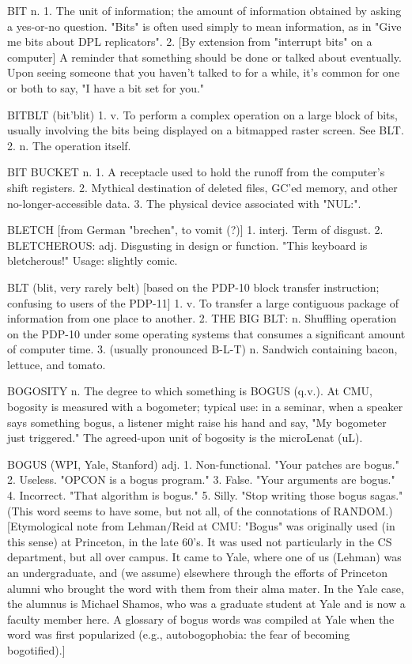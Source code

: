 BIT n. 1. The unit of information; the amount of information obtained
   by asking a yes-or-no question.  "Bits" is often used simply to
   mean information, as in "Give me bits about DPL replicators".  2.
   [By extension from "interrupt bits" on a computer] A reminder that
   something should be done or talked about eventually.	 Upon seeing
   someone that you haven't talked to for a while, it's common for one
   or both to say, "I have a bit set for you."

BITBLT (bit'blit) 1. v. To perform a complex operation on a large
   block of bits, usually involving the bits being displayed on a
   bitmapped raster screen.  See BLT.  2. n. The operation itself.

BIT BUCKET n. 1. A receptacle used to hold the runoff from the
   computer's shift registers.	2. Mythical destination of deleted
   files, GC'ed memory, and other no-longer-accessible data.  3. The
   physical device associated with "NUL:".

BLETCH [from German "brechen", to vomit (?)] 1. interj. Term of
   disgust.  2. BLETCHEROUS: adj. Disgusting in design or function.
   "This keyboard is bletcherous!"  Usage: slightly comic.

BLT (blit, very rarely belt) [based on the PDP-10 block transfer
   instruction; confusing to users of the PDP-11] 1. v. To transfer a
   large contiguous package of information from one place to another.
   2. THE BIG BLT: n. Shuffling operation on the PDP-10 under some
   operating systems that consumes a significant amount of computer
   time.  3. (usually pronounced B-L-T) n. Sandwich containing bacon,
   lettuce, and tomato.

BOGOSITY n. The degree to which something is BOGUS (q.v.).  At CMU,
   bogosity is measured with a bogometer; typical use: in a seminar,
   when a speaker says something bogus, a listener might raise his
   hand and say, "My bogometer just triggered."	 The agreed-upon unit
   of bogosity is the microLenat (uL).

BOGUS (WPI, Yale, Stanford) adj. 1. Non-functional.  "Your patches are
   bogus."  2. Useless.	 "OPCON is a bogus program."  3. False.	 "Your
   arguments are bogus."  4. Incorrect.	 "That algorithm is bogus."
   5. Silly.  "Stop writing those bogus sagas."	 (This word seems to
   have some, but not all, of the connotations of RANDOM.)
   [Etymological note from Lehman/Reid at CMU:	"Bogus" was originally
   used (in this sense) at Princeton, in the late 60's.	 It was used
   not particularly in the CS department, but all over campus.	It
   came to Yale, where one of us (Lehman) was an undergraduate, and
   (we assume) elsewhere through the efforts of Princeton alumni who
   brought the word with them from their alma mater.  In the Yale
   case, the alumnus is Michael Shamos, who was a graduate student at
   Yale and is now a faculty member here.  A glossary of bogus words
   was compiled at Yale when the word was first popularized (e.g.,
   autobogophobia: the fear of becoming bogotified).]


